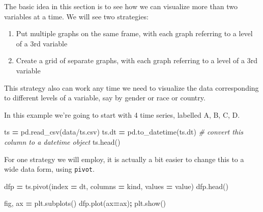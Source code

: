 \documentclass[
  letterpaper,
]{scrbook}
\newenvironment{Shaded}{\begin{snugshade}}{\end{snugshade}}
\newcommand{\CommentTok}[1]{\textcolor[rgb]{0.56,0.35,0.01}{\textit{#1}}}
\newcommand{\NormalTok}[1]{#1}
\newcommand{\OperatorTok}[1]{\textcolor[rgb]{0.81,0.36,0.00}{\textbf{#1}}}
\newcommand{\StringTok}[1]{\textcolor[rgb]{0.31,0.60,0.02}{#1}}
\providecommand{\tightlist}{%
  \setlength{\itemsep}{0pt}\setlength{\parskip}{0pt}}
\begin{document}
The basic idea in this section is to see how we can visualize more than two variables at a time. We will see two strategies:

\begin{enumerate}
\def\labelenumi{\arabic{enumi}.}
\tightlist
\item
  Put multiple graphs on the same frame, with each graph referring to a level of a 3rd variable
\item
  Create a grid of separate graphs, with each graph referring to a level of a 3rd variable
\end{enumerate}

This strategy also can work any time we need to visualize the data corresponding to different levels of a variable, say by gender or race or country.

In this example we're going to start with 4 time series, labelled A, B, C, D.

\begin{Shaded}
\begin{Highlighting}[]
\NormalTok{ts }\OperatorTok{=}\NormalTok{ pd.read\_csv(}\StringTok{\textquotesingle{}data/ts.csv\textquotesingle{}}\NormalTok{)}
\NormalTok{ts.dt }\OperatorTok{=}\NormalTok{ pd.to\_datetime(ts.dt) }\CommentTok{\# convert this column to a datetime object}
\NormalTok{ts.head()}
\end{Highlighting}
\end{Shaded}

For one strategy we will employ, it is actually a bit easier to change this to a wide data form, using \texttt{pivot}.

\begin{Shaded}
\begin{Highlighting}[]
\NormalTok{dfp }\OperatorTok{=}\NormalTok{ ts.pivot(index }\OperatorTok{=} \StringTok{\textquotesingle{}dt\textquotesingle{}}\NormalTok{, columns }\OperatorTok{=} \StringTok{\textquotesingle{}kind\textquotesingle{}}\NormalTok{, values }\OperatorTok{=} \StringTok{\textquotesingle{}value\textquotesingle{}}\NormalTok{)}
\NormalTok{dfp.head()}
\end{Highlighting}
\end{Shaded}

\begin{Shaded}
\begin{Highlighting}[]
\NormalTok{fig, ax }\OperatorTok{=}\NormalTok{ plt.subplots()}
\NormalTok{dfp.plot(ax}\OperatorTok{=}\NormalTok{ax)}\OperatorTok{;}
\NormalTok{plt.show()}
\end{Highlighting}
\end{Shaded}
\end{document}
